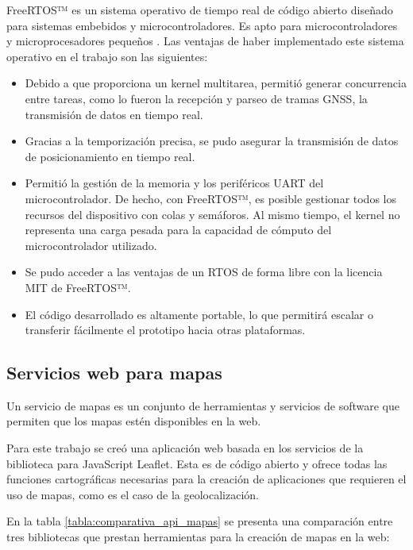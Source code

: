 FreeRTOS™ es un sistema operativo de tiempo real de código abierto diseñado para sistemas embebidos y microcontroladores. Es apto para microcontroladores y microprocesadores pequeños \citep{FreeRTOS}. Las ventajas de haber implementado este sistema operativo en el trabajo son las siguientes:

\begin{itemize}
    \item Debido a que proporciona un kernel multitarea, permitió generar concurrencia entre tareas, como lo fueron la recepción y parseo de tramas GNSS, la transmisión de datos en tiempo real.  
    \item Gracias a la temporización precisa, se pudo asegurar la transmisión de datos de posicionamiento en tiempo real. 
    \item Permitió la gestión de la memoria y los periféricos UART del microcontrolador. De hecho, con FreeRTOS™, es posible gestionar todos los recursos del dispositivo con colas y semáforos. Al mismo tiempo, el kernel no representa una carga pesada para la capacidad de cómputo del microcontrolador utilizado. 
    \item Se pudo acceder a las ventajas de un RTOS de forma libre con la licencia MIT de FreeRTOS™.
    \item El código desarrollado es altamente portable, lo que permitirá escalar o transferir fácilmente el prototipo hacia otras plataformas. 
\end{itemize}



\subsection{Servicios web para mapas}
\label{sec:mapas_web}

Un servicio de mapas es un conjunto de herramientas y servicios de software que permiten que los mapas estén disponibles en la web. 

Para este trabajo se creó una aplicación web basada en los servicios de la biblioteca para JavaScript Leaflet. Esta es de código abierto y ofrece todas las funciones cartográficas necesarias para la creación de aplicaciones que requieren el uso de mapas, como es el caso de la geolocalización.

En la tabla \ref{tabla:comparativa_api_mapas} se presenta una comparación entre tres bibliotecas que prestan herramientas para la creación de mapas en la web: 

